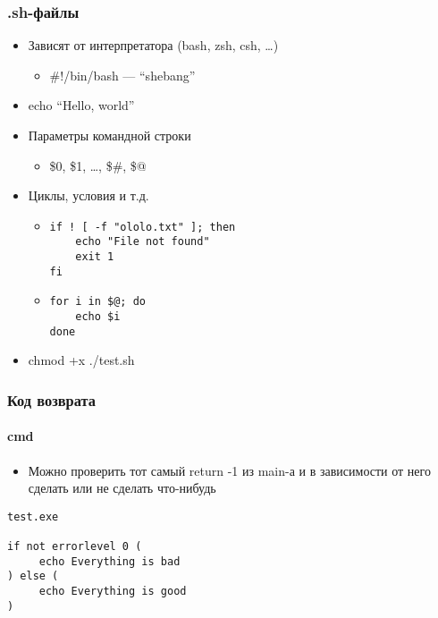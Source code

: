 \documentclass{../../slides-style}
\begin{document}
    \begin{frame}[fragile]
        \frametitle{.sh-файлы}
        \begin{itemize}
            \item Зависят от интерпретатора (bash, zsh, csh, …)
            \begin{itemize}
                \item \#!/bin/bash --- ``shebang''
            \end{itemize}
            \item echo ``Hello, world''
            \item Параметры командной строки
            \begin{itemize}
                \item \$0, \$1, …, \$\#, \$@
            \end{itemize}
            \item Циклы, условия и т.д.
            \begin{itemize}
                \item 
                \begin{footnotesize}
                    \begin{verbatim}
if ! [ -f "ololo.txt" ]; then
    echo "File not found"
    exit 1
fi
                    \end{verbatim}
                \end{footnotesize}
                \item 
                \begin{footnotesize}
                    \begin{verbatim}
for i in $@; do
    echo $i
done
                    \end{verbatim}
                \end{footnotesize}
            \end{itemize}
            \item chmod +x ./test.sh
        \end{itemize}
    \end{frame}

    \begin{frame}[fragile]
        \frametitle{Код возврата}
        \framesubtitle{cmd}
        \begin{itemize}
            \item Можно проверить тот самый return -1 из main-а и в зависимости от него сделать или не сделать что-нибудь
        \end{itemize}
        \begin{verbatim}
test.exe

if not errorlevel 0 (
     echo Everything is bad
) else (
     echo Everything is good
)
        \end{verbatim}
    \end{frame}
\end{document}

